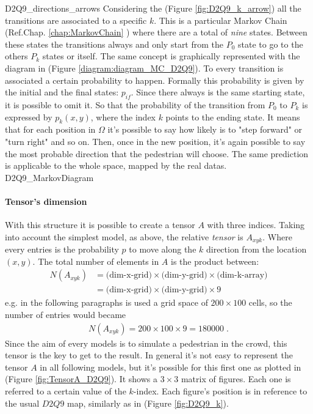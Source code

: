 \documentclass[class=article, crop=false]{standalone}
\begin{document}
	{D2Q9_directions_arrows}
Considering the (Figure \ref{fig:D2Q9_k_arrow}) all the transitions are associated to a specific $k$.
This is a particular Markov Chain (Ref.Chap. \ref{chap:MarkovChain} ) where there are a total of \emph{nine} states.
Between these states the transitions always and only start from the $P_0$ state to go to the others $P_k$ states or itself.
The same concept is graphically represented with the diagram in (Figure \ref{diagram:diagram_MC_D2Q9}).
To every transition is associated a certain probability to happen.
Formally this probability is given by the initial and the final states: $p_{if}$.
Since there always is the same starting state, it is possible to omit it.
So that the probability of the transition from $P_0$ to $P_k$ is expressed by $p_k(x,y)$, where the index $k$ points to the ending state.
It means that for each position in $\Omega$ it's possible to say how likely is to "step forward" or "turn right" and so on.
Then, once in the new position, it's again possible to say the most probable direction that the pedestrian will choose.
The same prediction is applicable to the whole space, mapped by the real datas.
	{D2Q9_MarkovDiagram}
\paragraph{Tensor's dimension}
With this structure it is possible to create a tensor $A$ with three indices.
Taking into account the simplest model, as above, the relative \emph{tensor} is $A_{x y k}$.
Where every entries is the probability $p$ to move along the $k$ direction from the location $(x, y)$.
The total number of elements in $A$ is the product between: 
\begin{equation*}
\begin{split}
N(A_{xyk}) &= \mbox{(dim-x-grid)} \times \mbox{(dim-y-grid)} \times \mbox{(dim-k-array)} \\
& = \mbox{(dim-x-grid)} \times \mbox{(dim-y-grid)} \times 9
\end{split}
\end{equation*}
e.g. in the following paragraphs is used a grid space of $200\times100$ cells, so the number of entries would became 
\begin{equation*}
\begin{split}
N(A_{xyk})=200\times100\times9 = 180000 \; .
\end{split}
\end{equation*}
Since the aim of every models is to simulate a pedestrian in the crowd, this tensor is the key to get to the result.
In general it's not easy to represent the tensor $A$ in all following models, but it's possible for this first one as plotted in (Figure \ref{fig:TensorA_D2Q9}).
It shows a $3\times3$ matrix of figures.
Each one is referred to a certain value of the $k$-index.
Each figure's position is in reference to the usual $D2Q9$ map, similarly as in (Figure \ref{fig:D2Q9_k}).
\end{document}
